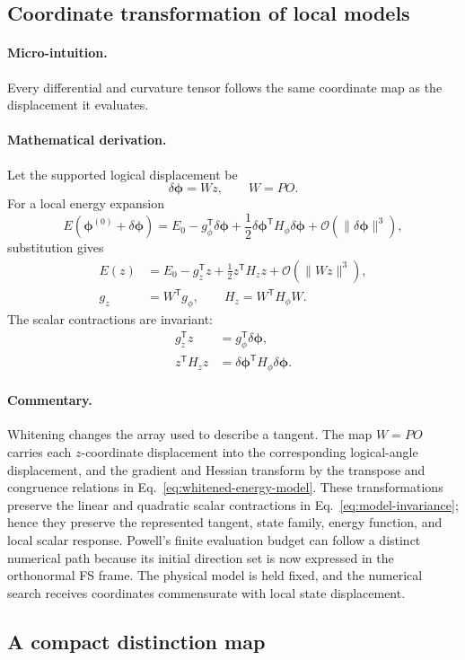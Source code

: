 \documentclass[10pt,twocolumn]{article}
\newcommand{\micro}{\paragraph{Micro-intuition.}}
\newcommand{\mathderiv}{\paragraph{Mathematical derivation.}}
\newcommand{\commentaryblock}{\paragraph{Commentary.}}
\begin{document}
\subsection*{Coordinate transformation of local models}

\micro Every differential and curvature tensor follows the same coordinate
map as the displacement it evaluates.

\mathderiv Let the supported logical displacement be
\begin{equation}
\delta\bm\phi=Wz,\qquad W=PO.
\label{eq:logical-whitened-map}
\end{equation}
For a local energy expansion
\begin{equation}
E(\bm\phi^{(0)}+\delta\bm\phi)
=E_0-g_\phi^{\mathsf T}\delta\bm\phi
+\frac12\delta\bm\phi^{\mathsf T}H_\phi\delta\bm\phi
+\mathcal O(\|\delta\bm\phi\|^3),
\label{eq:logical-energy-model}
\end{equation}
substitution gives
\begin{align}
E(z)
&=E_0-g_z^{\mathsf T}z
+\frac12z^{\mathsf T}H_zz
+\mathcal O(\|Wz\|^3),\nonumber\\
g_z&=W^{\mathsf T}g_\phi,\qquad
H_z=W^{\mathsf T}H_\phi W.
\label{eq:whitened-energy-model}
\end{align}
The scalar contractions are invariant:
\begin{align}
g_z^{\mathsf T}z
&=g_\phi^{\mathsf T}\delta\bm\phi,\nonumber\\
z^{\mathsf T}H_zz
&=\delta\bm\phi^{\mathsf T}H_\phi\delta\bm\phi.
\label{eq:model-invariance}
\end{align}

\commentaryblock Whitening changes the array used to describe a tangent. The
map \(W=PO\) carries each \(z\)-coordinate displacement into the corresponding
logical-angle displacement, and the gradient and Hessian transform by the
transpose and congruence relations in
Eq.~\eqref{eq:whitened-energy-model}. These transformations preserve the
linear and quadratic scalar contractions in
Eq.~\eqref{eq:model-invariance}; hence they preserve the represented tangent,
state family, energy function, and local scalar response. Powell's finite
evaluation budget can follow a distinct numerical path because its initial
direction set is now expressed in the orthonormal FS frame. The physical model
is held fixed, and the numerical search receives coordinates commensurate with
local state displacement.

\subsection*{A compact distinction map}
\end{document}
